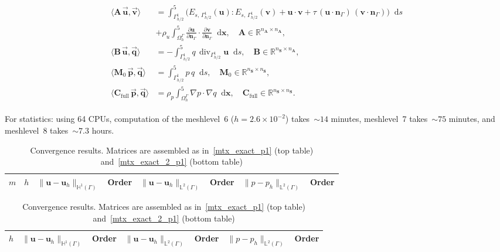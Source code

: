 \documentclass[12pt]{article}
\newcommand{\vect}[1]{\boldsymbol{\mathbf{#1}}}
\newcommand*\diff{\mathop{}\!\mathrm{d}}
\DeclareMathOperator{\Div}{div}
\newcommand{\LTwoSpace}[1][\Gamma]{{\mathbb L^2\left({#1}\right)}}
\newcommand{\HOneSpace}[1][\Gamma]{{\mathbb H^1\left({#1}\right)}}
\begin{document}
\begin{align}\begin{split}\label{mtx_exact_2_p1}
	\langle \vect A\,\vec{\vect u}, \vec{\vect v} \rangle &= 
		\int^5_{\Gamma_{h/2}^1} \big( E_{s,\,\Gamma_{h/2}^1}(\vect u) : E_{s,\,\Gamma_{h/2}^1}(\vect v) + \vect u\cdot\vect v + \tau\,(\vect u\cdot\vect n_{\Gamma})\,(\vect v\cdot\vect n_{\Gamma}) \big) \diff{s} \\
	&
		+ \rho_u \int^5_{\Omega_h^{\Gamma}} \frac{\partial \vect u}{\partial\vect n_{\Gamma}}\cdot\frac{\partial \vect v}{\partial\vect n_{\Gamma}} \diff{\vect x}, \quad \vect A \in \mathbb R^{n_{\vect A} \times n_{\vect A}},\\
	\langle \vect B\,\vec{\vect u}, \vec{\vect q} \rangle &= 
		-\int^5_{\Gamma_{h/2}^1} q\,\Div_{\Gamma_{h/2}^1} \vect u \diff{s}, \quad \vect B \in \mathbb R^{n_{\vect S} \times n_{\vect A}},\\
	\langle \vect M_0\,\vec{\vect p}, \vec{\vect q} \rangle &=
		\int^5_{\Gamma_{h/2}^1} p\,q \diff{s}, \quad \vect M_0 \in \mathbb R^{n_{\vect S} \times n_{\vect S}},\\
	\langle \vect C_{\text{full}}\,\vec{\vect p}, \vec{\vect q} \rangle &=
		\rho_p \int^5_{\Omega^{\Gamma}_h} \nabla p \cdot \nabla q \diff{\vect x}, \quad \vect C_{\text{full}} \in \mathbb R^{n_{\vect S} \times n_{\vect S}}.
\end{split}\end{align}

For statistics: using 64 CPUs, computation of the meshlevel~6 ($h = 2.6\times10^{-2}$) takes~${\sim}14$ minutes, meshlevel~7 takes~${\sim}75$ minutes, and meshlevel~8 takes~${\sim}7.3$ hours.

\begin{table}[h!]
	\centering\small
	\caption{Convergence results. Matrices are assembled as in~\eqref{mtx_exact_p1} (top table) and~\eqref{mtx_exact_2_p1} (bottom table)}
	\label{tab:p1p1_conv}
	\begin{subtable}{1.\linewidth}\centering
		\begin{tabular}[1.3]{|c||c||c|c||c|c||c|c|}
			\hline
			$m$ & $h$ & $\|\vect u - \vect u_h\|_{\HOneSpace}$ & Order & $\|\vect u - \vect u_h\|_{\LTwoSpace}$ & Order & $\|p - p_h\|_{\LTwoSpace}$ & Order \\
			\hline
			
		\end{tabular}
	\end{subtable}
	\vskip 4mm	
	\begin{subtable}{1.\linewidth}\centering
		\begin{tabular}[1.3]{|c||c|c||c|c||c|c|}
			\hline
			$h$ & $\|\vect u - \vect u_h\|_{\HOneSpace}$ & Order & $\|\vect u - \vect u_h\|_{\LTwoSpace}$ & Order & $\|p - p_h\|_{\LTwoSpace}$ & Order \\
			\hline
			
		\end{tabular}
	\end{subtable}
\end{table}
\end{document}
